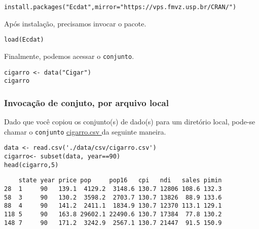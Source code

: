 \documentclass[11pt]{article}
\begin{document}
\begin{verbatim}
install.packages("Ecdat",mirror="https://vps.fmvz.usp.br/CRAN/")
\end{verbatim}

Após instalação, precisamos invocar o pacote.
\begin{verbatim}
load(Ecdat)
\end{verbatim}

Finalmente, podemos acessar o \texttt{conjunto}.
\begin{verbatim}
cigarro <- data("Cigar")
cigarro
\end{verbatim}

\subsubsection{Invocação de conjuto, por arquivo local}
\label{sec:org233e5c3}

Dado que você copiou os conjunto(s) de dado(s) para um diretório
local, pode-se chamar o \texttt{conjunto} \href{https://drive.google.com/file/d/1iOQFp0TshV8km2X13fRkXGm8kd-ZVfSL/view?usp=sharing}{cigarro.csv }da seguinte maneira.

\begin{verbatim}
data <- read.csv('./data/csv/cigarro.csv')
cigarro<- subset(data, year==90)
head(cigarro,5)
\end{verbatim}

\begin{verbatim}
    state year price pop     pop16   cpi   ndi   sales pimin
28  1     90   139.1  4129.2  3148.6 130.7 12806 108.6 132.3
58  3     90   130.2  3598.2  2703.7 130.7 13826  88.9 133.6
88  4     90   141.2  2411.1  1834.9 130.7 12370 113.1 129.1
118 5     90   163.8 29602.1 22490.6 130.7 17384  77.8 130.2
148 7     90   171.2  3242.9  2567.1 130.7 21447  91.5 150.9
\end{verbatim}
\end{document}
